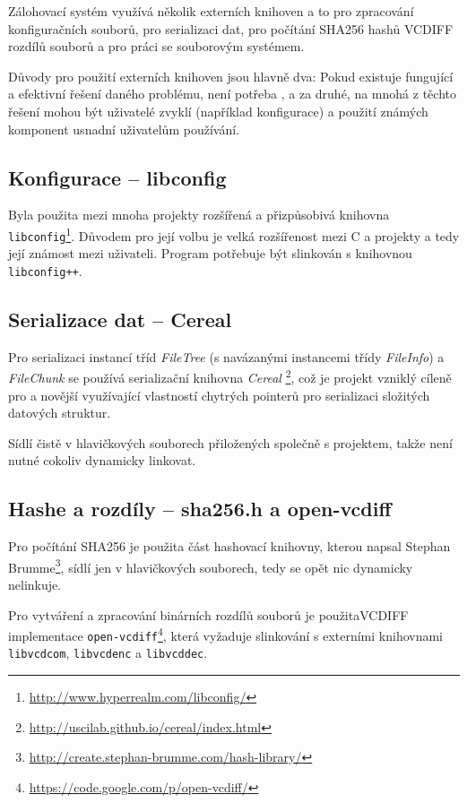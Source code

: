 Zálohovací systém využívá několik externích knihoven a to pro zpracování
konfiguračních souborů, pro serializaci dat, pro počítání \gls{SHA256} hashů
\gls{VCDIFF} rozdílů souborů a pro práci se souborovým systémem.

Důvody pro použití externích knihoven jsou hlavně dva: Pokud existuje fungující
a efektivní řešení daného problému, není potřeba , a za
druhé, na mnohá z těchto řešení mohou být uživatelé zvyklí (například konfigurace)
a použití známých komponent usnadní uživatelům používání.

\subsection*{Konfigurace -- libconfig}

Byla použita mezi mnoha projekty rozšířená a přizpůsobivá knihovna
\texttt{libconfig}\footnote{\url{http://www.hyperrealm.com/libconfig/}}. Důvodem
pro její volbu je velká rozšířenost mezi C a \Cpp projekty a tedy její známost
mezi uživateli. Program potřebuje být slinkován s knihovnou
\texttt{libconfig++}.

\subsection*{Serializace dat -- Cereal}

Pro serializaci instancí tříd {\it FileTree} (s navázanými instancemi třídy
{\it FileInfo}) a {\it FileChunk} se používá serializační knihovna {\it Cereal}%
\footnote{\url{http://uscilab.github.io/cereal/index.html}}, což je projekt
vzniklý cíleně pro  a novější využívající vlastností chytrých
pointerů pro serializaci složitých datových struktur.

Sídlí čistě v hlavičkových souborech přiložených společně s projektem, takže
není nutné cokoliv dynamicky linkovat.

\subsection*{Hashe a rozdíly -- sha256.h a open-vcdiff}

Pro počítání \gls{SHA256} je použita část hashovací knihovny, kterou napsal
Stephan Brumme\footnote{\url{http://create.stephan-brumme.com/hash-library/}},
sídlí jen v hlavičkových souborech, tedy se opět nic dynamicky nelinkuje.

Pro vytváření a zpracování binárních rozdílů souborů je použita\gls{VCDIFF}
implementace \texttt{open-vcdiff}\footnote{\url{https://code.google.com/p/open-vcdiff/}},
která vyžaduje slinkování s externími knihovnami \texttt{libvcdcom}, \texttt{libvcdenc}
a \texttt{libvcddec}.


